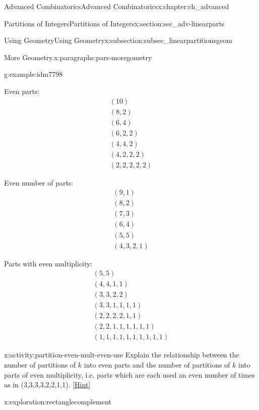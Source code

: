 \documentclass[oneside,10pt,]{book}
\numberwithin{equation}{chapter}
\begin{document}
\begin{chapterptx}{Advanced Combinatorics}{}{Advanced Combinatorics}{}{}{x:chapter:ch_advanced}
\begin{sectionptx}{Partitions of Integers}{}{Partitions of Integers}{}{}{x:section:sec_adv-linearparts}
\begin{subsectionptx}{Using Geometry}{}{Using Geometry}{}{}{x:subsection:subsec_linearpartitionsgeom}
\begin{paragraphs}{More Geometry.}{x:paragraphs:pars-moregometry}
\begin{example}{}{g:example:idm7798}
\begin{sidebyside}{3}{0.0166666666666667}{0.0166666666666667}{0.0333333333333333}%
\begin{sbspanel}{0.2}%
Even parts:%
\begin{gather*}
(10) \\
(8, 2)\\
(6, 4)\\
(6, 2, 2)\\
(4,4,2)\\
(4,2,2,2)\\
(2,2,2,2,2)
\end{gather*}
%
\end{sbspanel}%
\begin{sbspanel}{0.3}%
\par
Even number of parts:%
\begin{gather*}
(9,1) \\
(8,2) \\
(7,3) \\
(6,4) \\
(5,5) \\
(4,3,2,1) 
\end{gather*}
%
\end{sbspanel}%
\begin{sbspanel}{0.4}%
\par
Parts with even multiplicity:%
\begin{gather*}
(5,5) \\
(4,4,1,1) \\
(3,3,2,2) \\
(3,3,1,1,1,1) \\
(2,2,2,2,1,1) \\
(2,2,1,1,1,1,1,1) \\
(1,1,1,1,1,1,1,1,1,1) 
\end{gather*}
%
\end{sbspanel}%
\end{sidebyside}%
\end{example}
\begin{activity}{}{x:activity:partition-even-mult-even-use}%
Explain the relationship between the number of partitions of \(k\) into even parts and the number of partitions of \(k\) into parts of even multiplicity, i.e. parts which are each used an even number of times as in (3,3,3,3,2,2,1,1).%
\space\hspace*{0pt}\hfill{\tiny\hyperlink{g:hint:idm7835-back}{[Hint]}}\end{activity}
\begin{exploration}{}{x:exploration:rectanglecomplement}%

\end{exploration}
\end{paragraphs}
\end{subsectionptx}
\end{sectionptx}
\end{chapterptx}
\end{document}
